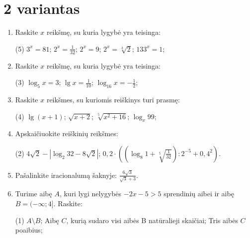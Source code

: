 \documentclass[a4paper]{article}
\begin{document}
\section*{2 variantas}

\begin{enumerate}
      \item Raskite $x$ reikšmę, su kuria lygybė yra teisinga:

            \begin{tasks}[item-format={\normalfont}, after-item-skip=4mm](5)
                  \task $3^{x}=81$;
                  \task $2^{x}=\frac{1}{32}$;
                  \task $2^{x}=9$;
                  \task $2^{x}=\sqrt[3]{2}$;
                  \task $133^{x}=1$;
            \end{tasks}

      \item Raskite $x$  reikšmę, su kuria lygybė yra teisinga:
            \begin{tasks}[item-format={\normalfont}, after-item-skip=4mm](3)
                  \task $\log_{5} x=3$;
                  \task $\lg x=\frac{1}{10}$;
                  \task $\log_{16} x=-\frac{1}{2}$;
            \end{tasks}

      \item Raskite $x$ reikšmes, su kuriomis reiškinys turi prasmę:
            \begin{tasks}[item-format={\normalfont}, after-item-skip=4mm](4)
                  \task $\lg (x+1)$;
                  \task $\sqrt{x+2}$;
                  \task $\sqrt[5]{x^{2}+16}$;
                  \task $\log_{x}99$;
            \end{tasks}

      \item Apskaičiuokite reiškinių reikšmes:
            \begin{tasks}[item-format={\normalfont}, after-item-skip=10mm](2)
                  \task $4\sqrt{2}-\left|\log_{2}32-8\sqrt{2}\right|$;
                  \task $0,2 \cdot
                        ((\log_{8}1+\sqrt[5]{\frac{1}{32}}):2^{-5}+0,4^2)$.
            \end{tasks}
      \item Pašalinkite iracionalumą šaknyje: $\frac{6\sqrt{3}}{\sqrt{3}+3}$.
      \item Turime aibę $A$, kuri lygi nelygybės $-2x-5>5$ sprendinių aibei ir
            aibę $B=(-\infty;4]$. Raskite:
            \begin{tasks}[item-format={\normalfont}, after-item-skip=2mm](1)
                  \task $A \setminus B$;
                  \task Aibę $C$, kurią sudaro visi aibės B natūralieji
                  skaičiai;
                  \task Tris aibės $C$ poaibius;
            \end{tasks}

\end{enumerate}
\end{document}
